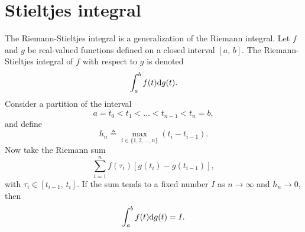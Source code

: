 \section{Stieltjes integral} \label{app:stieltjes}
The Riemann-Stieltjes integral is a generalization of the Riemann integral. Let $f$ and $g$ be real-valued functions defined on a closed interval $[a,\,b]$. The Riemann-Stieltjes integral of $f$ with respect to $g$ is denoted 
\begin{equation} \label{eq:stieltjes}
	\int_a^b f(t) \rm dg(t).
\end{equation}
Consider a partition of the interval
\begin{equation}
	a = t_0 < t_1 < \dots < t_{n-1} < t_n = b,
\end{equation}
and define 
\begin{equation}
	h_n \triangleq \max_{i \in \{1,2,\dots,n\}} (t_i - t_{i-1}).
\end{equation}
Now take the Riemann sum
\begin{equation}
	\sum_{i=1}^{n} f(\tau_i)[g(t_i) - g(t_{i-1})],
\end{equation}
with $\tau_i \in [t_{i-1},\,t_i]$. If the sum tends to a fixed number $I$ as $n \rightarrow \infty$ and $h_n \rightarrow 0$, then
\begin{equation}
	\int_a^b f(t) \rm dg(t) = I.
\end{equation}

